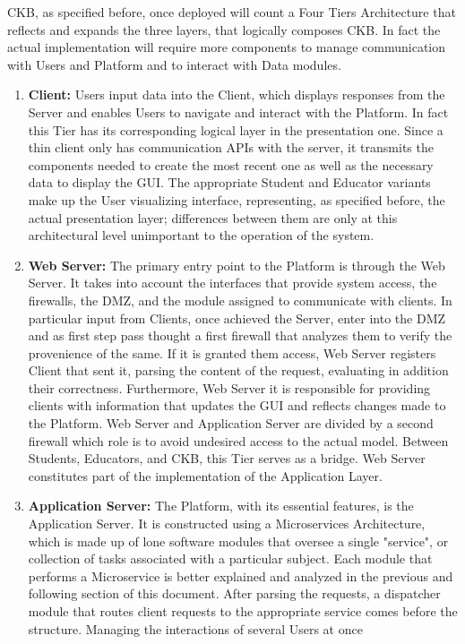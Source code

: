 CKB, as specified before, once deployed will count a Four Tiers Architecture that reflects and expands the three layers, that logically composes CKB.
In fact the actual implementation will require more components to manage communication with Users and Platform and to interact with Data modules.
\begin{enumerate}[label=$\bullet$]
    \item \textbf{Client:} Users input data into the Client, which displays responses from the Server and enables Users to navigate and interact with the Platform. In fact this Tier has its corresponding logical layer in the presentation one. 
    Since a thin client only has communication APIs with the server, it transmits the components needed to create the most recent one as well as the necessary data to display the GUI.
    The appropriate Student and Educator variants make up the User visualizing interface, representing, as specified before, the actual presentation layer; differences between them 
    are only at this architectural level unimportant to the operation of the system.
    \item \textbf{Web Server:} The primary entry point to the Platform is through the Web Server. It takes into account the interfaces that provide system access, the firewalls, the DMZ, and the module assigned to communicate with 
    clients. In particular input from Clients, once achieved the Server, enter into the DMZ and as first step pass thought a first firewall that analyzes them to verify the provenience of the same. If it is granted them access, Web Server registers Client that sent it, parsing the content of the request, evaluating in addition their correctness. 
    Furthermore, Web Server it is responsible for providing clients with information that updates the GUI and reflects changes made to the Platform. Web Server and Application Server are divided by a second firewall which role is to avoid undesired access to the actual model. Between Students, Educators, 
    and CKB, this Tier serves as a bridge. Web Server constitutes part of the implementation of the Application Layer.
    \item \textbf{Application Server:} The Platform, with its essential features, is the Application Server. It is constructed using a Microservices Architecture, which is made up of lone software modules that oversee a single 
    "service", or collection of tasks associated with a particular subject. Each module that performs a Microservice is better explained and analyzed in the previous and following section of this document. After parsing the requests, a dispatcher module that routes client requests to the appropriate service comes before the structure. Managing the interactions of several Users at once 

\end{enumerate}
